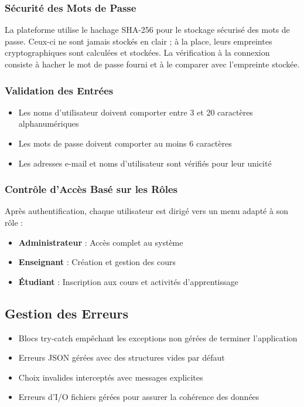 \documentclass[12pt,a4paper]{article}
\begin{document}
\subsubsection{Sécurité des Mots de Passe}
La plateforme utilise le hachage SHA-256 pour le stockage sécurisé des mots de passe. Ceux-ci ne sont jamais stockés en clair ; à la place, leurs empreintes cryptographiques sont calculées et stockées. La vérification à la connexion consiste à hacher le mot de passe fourni et à le comparer avec l'empreinte stockée.

\subsubsection{Validation des Entrées}
\begin{itemize}
    \item Les noms d'utilisateur doivent comporter entre 3 et 20 caractères alphanumériques
    \item Les mots de passe doivent comporter au moins 6 caractères
    \item Les adresses e-mail et noms d'utilisateur sont vérifiés pour leur unicité
\end{itemize}

\subsubsection{Contrôle d'Accès Basé sur les Rôles}
Après authentification, chaque utilisateur est dirigé vers un menu adapté à son rôle :
\begin{itemize}
    \item \textbf{Administrateur} : Accès complet au système
    \item \textbf{Enseignant} : Création et gestion des cours
    \item \textbf{Étudiant} : Inscription aux cours et activités d'apprentissage
\end{itemize}

\subsection{Gestion des Erreurs}

\begin{itemize}
    \item Blocs try-catch empêchant les exceptions non gérées de terminer l'application
    \item Erreurs JSON gérées avec des structures vides par défaut
    \item Choix invalides interceptés avec messages explicites
    \item Erreurs d'I/O fichiers gérées pour assurer la cohérence des données
\end{itemize}
\end{document}
